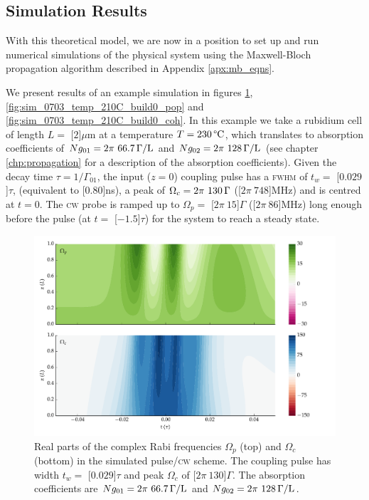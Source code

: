   \subsection{Simulation Results}

    With this theoretical model, we are now in a position to set up and run
    numerical simulations of the physical system using the Maxwell-Bloch
    propagation algorithm described in Appendix \ref{apx:mb_eqns}.

    We present results of an example simulation in figures
    \ref{fig:sim_0703_temp_210C_build0_fields},
    \ref{fig:sim_0703_temp_210C_build0_pop} and
    \ref{fig:sim_0703_temp_210C_build0_coh}. In this example we take a rubidium
    cell of length $L = $ \unit[$2$]{$\mu$m} at a temperature $T =
    \unit[230]{\textrm{\textdegree C}}$, which translates to absorption
    coefficients of $Ng_{01} = \unit[2\pi~66.7]{\Gamma/L}$ and $Ng_{02} =
    \unit[2\pi~128]{\Gamma/L}$ (see chapter \ref{chp:propagation} for a
    description of the absorption coefficients). Given the decay time $\tau =
    1/\Gamma_{01}$, the input ($z\!=\!0$) coupling pulse has a \textsc{fwhm} of
    $t_w = $ \unit[$0.029$]{$\tau$}, (equivalent to \unit[$0.80$]{ns}), a peak
    of $\Omega_c = \unit[2\pi~130]{\Gamma}$ (\unit[$2\pi~748$]{MHz}) and is
    centred at $t\!=\!0$. The \textsc{cw} probe is ramped up to $\Omega_p = $
    \unit[$2\pi~15$]{$\Gamma$} (\unit[$2\pi~86$]{MHz}) long enough before the
    pulse (at $t = $ \unit[$-1.5$]{$\tau$}) for the system to reach a steady
    state.

    \begin{figure}%
      \includegraphics[width=\linewidth]
        {figs/06_simultons/mb_vee2g_build0_15c_130p_0330t_230C_sb50_120vel000_00_002um_fig2.pdf}
      \caption{
      Real parts of the complex Rabi frequencies $\Omega_{p}$ (top) and
      $\Omega_{c}$ (bottom) in the simulated pulse/\textsc{cw} scheme. The
      coupling pulse has width $t_w = $ \unit[$0.029$]{$\tau$} and peak
      $\Omega_c$ of \unit[$2\pi~130$]{$\Gamma$}. The absorption coefficients are
      $Ng_{01} = \unit[2\pi~66.7]{\Gamma/L}$ and $Ng_{02} =
      \unit[2\pi~128]{\Gamma/L}$.
      }
      \label{fig:sim_0703_temp_210C_build0_fields}
    \end{figure}

